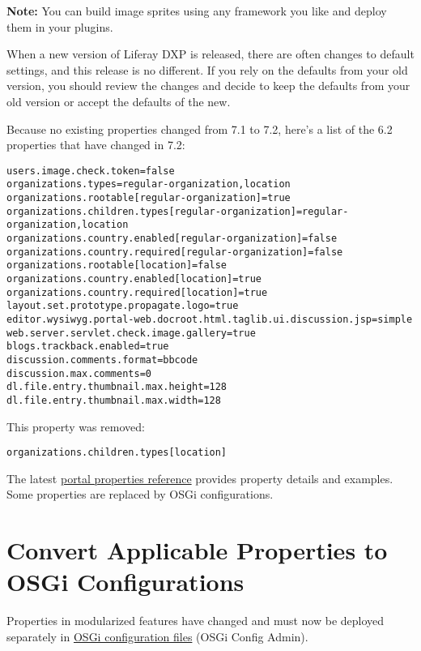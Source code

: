 \noindent\hrulefill

\textbf{Note:} You can build image sprites using any framework you like
and deploy them in your plugins.

\noindent\hrulefill

When a new version of Liferay DXP is released, there are often changes
to default settings, and this release is no different. If you rely on
the defaults from your old version, you should review the changes and
decide to keep the defaults from your old version or accept the defaults
of the new.

Because no existing properties changed from 7.1 to 7.2, here's a list of
the 6.2 properties that have changed in 7.2:

\begin{verbatim}
users.image.check.token=false
organizations.types=regular-organization,location
organizations.rootable[regular-organization]=true
organizations.children.types[regular-organization]=regular-organization,location
organizations.country.enabled[regular-organization]=false
organizations.country.required[regular-organization]=false
organizations.rootable[location]=false
organizations.country.enabled[location]=true
organizations.country.required[location]=true
layout.set.prototype.propagate.logo=true
editor.wysiwyg.portal-web.docroot.html.taglib.ui.discussion.jsp=simple
web.server.servlet.check.image.gallery=true
blogs.trackback.enabled=true
discussion.comments.format=bbcode
discussion.max.comments=0
dl.file.entry.thumbnail.max.height=128
dl.file.entry.thumbnail.max.width=128
\end{verbatim}

This property was removed:

\begin{verbatim}
organizations.children.types[location]
\end{verbatim}

The latest
\href{https://docs.liferay.com/dxp/portal/7.2-latest/propertiesdoc/portal.properties.html}{portal
properties reference} provides property details and examples. Some
properties are replaced by OSGi configurations.

\section{Convert Applicable Properties to OSGi
Configurations}\label{convert-applicable-properties-to-osgi-configurations}

Properties in modularized features have changed and must now be deployed
separately in
\href{/docs/7-2/user/-/knowledge_base/u/system-settings\#exporting-and-importing-configurations}{OSGi
configuration files} (OSGi Config Admin).


